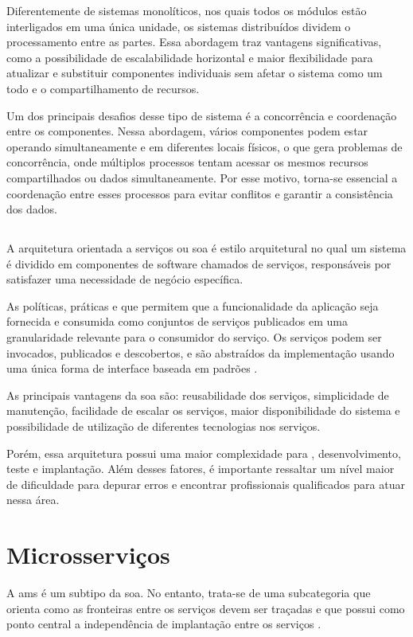 Diferentemente de sistemas monolíticos, nos quais todos os módulos estão interligados em uma única unidade, os sistemas distribuídos dividem o processamento entre as partes. Essa abordagem traz vantagens significativas, como a possibilidade de escalabilidade horizontal e maior flexibilidade para atualizar e substituir componentes individuais sem afetar o sistema como um todo e o compartilhamento de recursos.

Um dos principais desafios desse tipo de sistema é a concorrência e coordenação entre os componentes. Nessa abordagem, vários componentes podem estar operando simultaneamente e em diferentes locais físicos, o que gera problemas de concorrência, onde múltiplos processos tentam acessar os mesmos recursos compartilhados ou dados simultaneamente. Por esse motivo, torna-se essencial a coordenação entre esses processos para evitar conflitos e garantir a consistência dos dados.

\subsection{} 
A arquitetura orientada a serviços ou \acrfull{soa} é estilo arquitetural no qual um sistema é dividido em componentes de software chamados de serviços, responsáveis por satisfazer uma necessidade de negócio específica.

As políticas, práticas e  que permitem que a funcionalidade da aplicação seja fornecida e consumida como conjuntos de serviços publicados em uma granularidade relevante para o consumidor do serviço. Os serviços podem ser invocados, publicados e descobertos, e são abstraídos da implementação usando uma única forma de interface baseada em padrões \cite{understandingSOA}.

As principais vantagens da \acrshort{soa} são: reusabilidade dos serviços, simplicidade de manutenção, facilidade de escalar os serviços, maior disponibilidade do sistema e possibilidade de utilização de diferentes tecnologias nos serviços.

Porém, essa arquitetura possui uma maior complexidade para , desenvolvimento, teste e implantação. Além desses fatores, é importante ressaltar um nível maior de dificuldade para depurar erros e encontrar profissionais qualificados para atuar nessa área.

\section{Microsserviços} 
A \acrfull{ams} é um subtipo da \acrshort{soa}. No entanto, trata-se de uma subcategoria que orienta como as fronteiras entre os serviços devem ser traçadas e que possui como ponto central a independência de implantação entre os serviços \cite{buildingMicroservices}.

